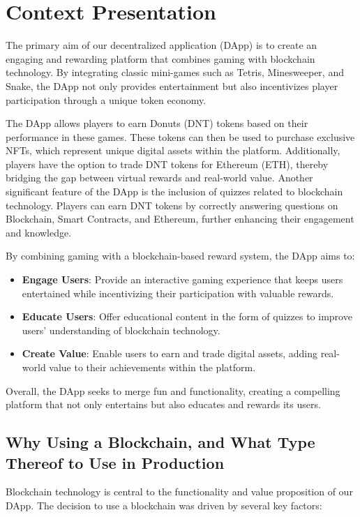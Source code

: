 \documentclass[../main.tex]{subfiles}
\begin{document}
\section{Context Presentation}\label{sec:context_presentations}
The primary aim of our decentralized application (DApp) is to create an engaging and rewarding platform that combines gaming with blockchain technology. By integrating classic mini-games such as Tetris, Minesweeper, and Snake, the DApp not only provides entertainment but also incentivizes player participation through a unique token economy.

The DApp allows players to earn Donuts (DNT) tokens based on their performance in these games. These tokens can then be used to purchase exclusive NFTs, which represent unique digital assets within the platform. Additionally, players have the option to trade DNT tokens for Ethereum (ETH), thereby bridging the gap between virtual rewards and real-world value. Another significant feature of the DApp is the inclusion of quizzes related to blockchain technology. Players can earn DNT tokens by correctly answering questions on Blockchain, Smart Contracts, and Ethereum, further enhancing their engagement and knowledge.

By combining gaming with a blockchain-based reward system, the DApp aims to:
\begin{itemize}
    \item \textbf{Engage Users}: Provide an interactive gaming experience that keeps users entertained while incentivizing their participation with valuable rewards.
    \item \textbf{Educate Users}: Offer educational content in the form of quizzes to improve users' understanding of blockchain technology.
    \item \textbf{Create Value}: Enable users to earn and trade digital assets, adding real-world value to their achievements within the platform.
\end{itemize}
Overall, the DApp seeks to merge fun and functionality, creating a compelling platform that not only entertains but also educates and rewards its users.

\subsection{Why Using a Blockchain, and What Type Thereof to Use in Production}

Blockchain technology is central to the functionality and value proposition of our DApp. The decision to use a blockchain was driven by several key factors:
\end{document}
